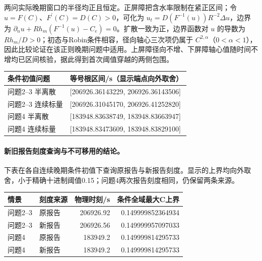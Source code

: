 两问实际晚期窗口的半径均正且恒定。正屏障把含水率限制在紧正区间；令 $u=F(C)$、$F^{\prime}(C)=D(C)>0$，可化为 $u_t=D(F^{-1}(u))R^{-2}\Delta u$，边界为 $\partial_nu+Rh_m(F^{-1}(u)-C_e)=0$。扩散一致为正，边界函数对 $u$ 的导数为 $Rh_m/D>0$；初态与Robin条件相容，径向轴心三次项仍属于 $C^{2,\alpha}$（$0<\alpha<1$），因此比较论证在该正则晚期问题中适用。上屏障径向不增、下屏障轴心值随时间不增均已区间核验，据此得到首次阈值穿越的两侧包围。

\begin{center}\small\begin{tabular}{ll}\hline 条件初值问题 & 等号根区间/s（显示端点向外取舍） \\\hline

问题2--3 半离散 & [206926.36143229, 206926.36143506] \\

问题2--3 连续标量 & [206926.31045170, 206926.41252820] \\

问题4 半离散 & [183948.83638749, 183948.83663947] \\

问题4 连续标量 & [183948.83473609, 183948.83829100] \\

\hline\end{tabular}\end{center}

\paragraph{新旧报告刻度查询与不可移用的结论。}

下表在各自连续晚期条件初值下查询原报告与新报告刻度。显示的上界均向外取舍，小于精确十进制阈值0.15；问题4两次报告刻度相同，仍保留两条来源。

\begin{center}\small\begin{tabular}{llrr}\hline 情景 & 刻度来源 & 物理时刻/s & 条件全域最大C上界 \\\hline

问题2--3 & 原报告 & 206926.92 & 0.149999852364934 \\

问题2--3 & 新报告 & 206926.56 & 0.149999957097033 \\

问题4 & 原报告 & 183949.2 & 0.149999814295733 \\

问题4 & 新报告 & 183949.2 & 0.149999814295733 \\

\hline\end{tabular}\end{center}

